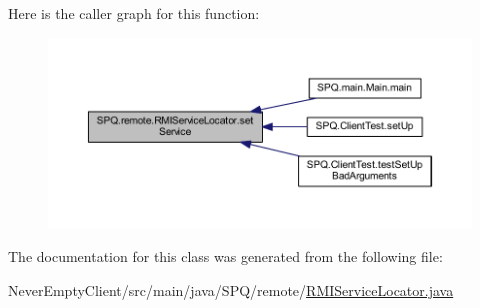 Here is the caller graph for this function\+:\nopagebreak
\begin{figure}[H]
\begin{center}
\leavevmode
\includegraphics[width=350pt]{class_s_p_q_1_1remote_1_1_r_m_i_service_locator_ae4d529073f4b435fa3d0fedcaad0fc70_icgraph}
\end{center}
\end{figure}


The documentation for this class was generated from the following file\+:\begin{DoxyCompactItemize}
\item 
Never\+Empty\+Client/src/main/java/\+S\+P\+Q/remote/\mbox{\hyperlink{_r_m_i_service_locator_8java}{R\+M\+I\+Service\+Locator.\+java}}\end{DoxyCompactItemize}
